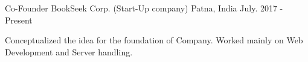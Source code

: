 \begin{cventries}
 
  \cventry
    {Co-Founder}
    {BookSeek Corp. (Start-Up company)}
    {Patna, India}
    {July. 2017 - Present}
    {
      \begin{cvitems}
        \item {Conceptualized the idea for the foundation of Company. Worked mainly on Web Development and Server handling.}
      \end{cvitems}
    }
    
\end{cventries}
